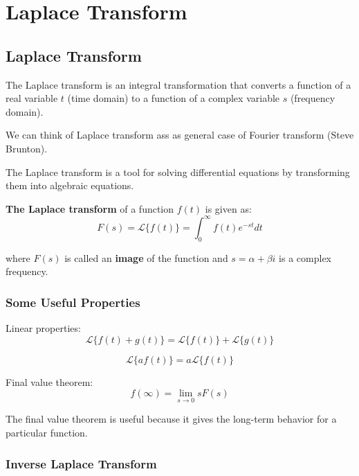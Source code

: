\section{Laplace Transform}

\subsection{Laplace Transform}

The Laplace transform is an integral transformation that converts a function of a real variable \(t\) (time domain) to a function of a complex variable \(s\) (frequency domain). 

We can think of Laplace transform ass as general case of Fourier transform (Steve Brunton).

The Laplace transform is a tool for solving differential equations by transforming them into algebraic equations.

\textbf{The Laplace transform }of a function \(f(t)\) is given as:
\begin{equation}
    F(s) = \mathcal{L} \{ f(t)\} = \int_0^\infty f(t) e^{-st}dt
\end{equation}

where \(F(s)\) is called an \textbf{image} of the function and \(s=\alpha +\beta i \) is a complex frequency.

\subsubsection{Some Useful Properties}

Linear properties:
\begin{equation}
    {\mathcal {L}}\{f(t)+g(t)\}={\mathcal {L}}\{f(t)\}+{\mathcal {L}}\{g(t)\}
\end{equation}

\begin{equation}
    {\mathcal {L}}\{af(t)\}=a{\mathcal {L}}\{f(t)\}
\end{equation}

Final value theorem:
\begin{equation}
    f(\infty )=\lim _{s\to 0}{sF(s)}
\end{equation}

The final value theorem is useful because it gives the long-term behavior for a particular function.

\subsubsection{Inverse Laplace Transform}

